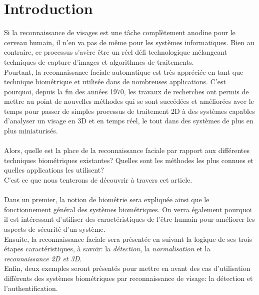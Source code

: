 \section{Introduction}
Si la reconnaissance de visages est une tâche complètement anodine pour le cerveau humain, il n'en va pas de même pour les systèmes informatiques. Bien au contraire, ce processus s'avère être un réel défi technologique mélangeant techniques de capture d'images et algorithmes de traitements. \\
Pourtant, la reconnaissance faciale automatique est très appréciée en tant que technique biométrique et utilisée dans de nombreuses applications. C'est pourquoi, depuis la fin des années 1970, les travaux de recherches ont permis de mettre au point de nouvelles méthodes qui se sont succédées et améliorées avec le temps pour passer de simples processus de traitement 2D à des systèmes capables d'analyser un visage en 3D et en temps réel, le tout dans des systèmes de plus en plus miniaturisés.
\paragraph{}
Alors, quelle est la place de la reconnaissance faciale par rapport aux différentes techniques biométriques existantes? Quelles sont les méthodes les plus connues et quelles applications les utilisent?\\ C'est ce que nous tenterons de découvrir à travers cet article.
\paragraph{}
Dans un premier, la notion de biométrie sera expliquée ainsi que le fonctionnement général des systèmes biométriques. On verra également pourquoi il est intéressant d'utiliser des caractéristiques de l'être humain pour améliorer les aspects de sécurité d'un système.
\\
Ensuite, la reconnaissance faciale sera présentée en suivant la logique de ses trois étapes caractéristiques, à savoir: la \textit{détection}, la \textit{normalisation} et la \textit{reconnaissance 2D et 3D}.
\\
Enfin, deux exemples seront présentés pour mettre en avant des cas d'utilisation différents des systèmes biométriques par reconnaissance de visage: la détection et l'authentification.